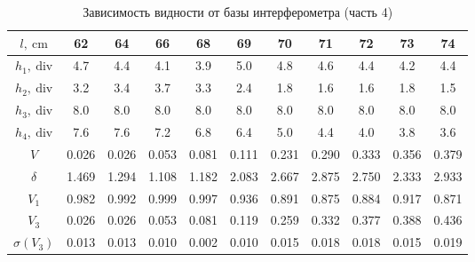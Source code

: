 \documentclass[12pt, a4paper]{article}
\begin{document}
\begin{table}[h!]
    \centering
    \caption{Зависимость видности от базы интерферометра (часть 4)}
    \begin{tabular}{|c|c|c|c|c|c|c|c|c|c|c|}
        \hline
        $l,~\mathrm{cm}$    & 62    & 64    & 66    & 68    & 69    & 70    & 71    & 72    & 73    & 74    \\
        \hline
        $h_1,~\mathrm{div}$ & 4.7   & 4.4   & 4.1   & 3.9   & 5.0   & 4.8   & 4.6   & 4.4   & 4.2   & 4.4   \\
        \hline
        $h_2,~\mathrm{div}$ & 3.2   & 3.4   & 3.7   & 3.3   & 2.4   & 1.8   & 1.6   & 1.6   & 1.8   & 1.5   \\
        \hline
        $h_3,~\mathrm{div}$ & 8.0   & 8.0   & 8.0   & 8.0   & 8.0   & 8.0   & 8.0   & 8.0   & 8.0   & 8.0   \\
        \hline
        $h_4,~\mathrm{div}$ & 7.6   & 7.6   & 7.2   & 6.8   & 6.4   & 5.0   & 4.4   & 4.0   & 3.8   & 3.6   \\
        \hline
        $V$                 & 0.026 & 0.026 & 0.053 & 0.081 & 0.111 & 0.231 & 0.290 & 0.333 & 0.356 & 0.379 \\
        \hline
        $\delta$            & 1.469 & 1.294 & 1.108 & 1.182 & 2.083 & 2.667 & 2.875 & 2.750 & 2.333 & 2.933 \\
        \hline
        $V_1$               & 0.982 & 0.992 & 0.999 & 0.997 & 0.936 & 0.891 & 0.875 & 0.884 & 0.917 & 0.871 \\
        \hline
        $V_3$               & 0.026 & 0.026 & 0.053 & 0.081 & 0.119 & 0.259 & 0.332 & 0.377 & 0.388 & 0.436 \\
        \hline
        $\sigma(V_3)$       & 0.013 & 0.013 & 0.010 & 0.002 & 0.010 & 0.015 & 0.018 & 0.018 & 0.015 & 0.019 \\
        \hline
    \end{tabular}
\end{table}
\end{document}
